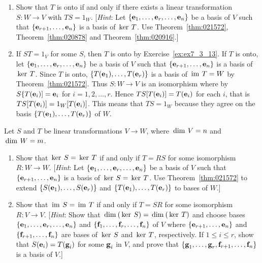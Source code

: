 \begin{multicols}{2}
\begin{ex}
\begin{enumerate}[label={\alph*.}]
\item Show that $T$ is onto if and only if there exists a linear transformation $S : W \to V$ with $TS = 1_{W}$. [\textit{Hint}: Let $\{\textbf{e}_{1}, \dots, \textbf{e}_{r}, \dots, \textbf{e}_{n}\}$ be a basis of $V$ such that $\{\textbf{e}_{r+1}, \dots, \textbf{e}_{n}\}$ is a basis of $\thinspace\operatorname{ker \medspace}T$. Use Theorem~\ref{thm:021572}, Theorem~\ref{thm:020878} and Theorem~\ref{thm:020916}.]

\end{enumerate}
\begin{sol}
\begin{enumerate}[label={\alph*.}]
\setcounter{enumi}{1}
\item If $ST = 1_{V}$ for some $S$, then $T$ is onto by Exercise~\ref{ex:ex7_3_13}. If $T$ is onto, let $\{\textbf{e}_{1}, \dots, \textbf{e}_{r}, \dots, \textbf{e}_{n}\}$ be a basis of $V$ such that $\{\textbf{e}_{r+1}, \dots, \textbf{e}_{n}\}$ is a basis of $\thinspace\operatorname{ker \medspace}T$. Since $T$ is onto, $\{T(\textbf{e}_{1}), \dots, T(\textbf{e}_{r})\}$ is a basis of $\thinspace\operatorname{im \medspace}T = W$ by Theorem~\ref{thm:021572}. Thus $S : W \to V$ is an isomorphism where by $S\{T(\textbf{e}_{i})] = \textbf{e}_{i}$ for $i = 1, 2, \dots, r$. Hence $TS[T(\textbf{e}_{i})] = T(\textbf{e}_{i})$ for each $i$, that is $TS[T(\textbf{e}_{i})] = 1_{W}[T(\textbf{e}_{i})]$. This means that $TS = 1_{W}$ because they agree on the basis $\{T(\textbf{e}_{1}), \dots, T(\textbf{e}_{r})\}$ of $W$.

\end{enumerate}
\end{sol}
\end{ex}

\begin{ex}\label{ex:ex7_3_28}
Let $S$ and $T$ be linear transformations $V \to W$, where $\thinspace\operatorname{dim \medspace}V = n$ and $\thinspace\operatorname{dim \medspace}W = m$.


\begin{enumerate}[label={\alph*.}]
\item Show that $\thinspace\operatorname{ker \medspace}S = \thinspace\operatorname{ker \medspace}T$ if and only if $T = RS$ for some isomorphism $R : W \to W$. [\textit{Hint}: Let $\{\textbf{e}_{1}, \dots, \textbf{e}_{r}, \dots, \textbf{e}_{n}\}$ be a basis of $V$ such that $\{\textbf{e}_{r+1}, \dots, \textbf{e}_{n}\}$ is a basis of $\thinspace\operatorname{ker \medspace}S = \thinspace\operatorname{ker \medspace}T$. Use Theorem~\ref{thm:021572} to extend $\{S(\textbf{e}_{1}), \dots, S(\textbf{e}_{r})\}$ and $\{T(\textbf{e}_{1}), \dots, T(\textbf{e}_{r})\}$ to bases of $W$.]

\item Show that $\thinspace\operatorname{im \medspace}S = \thinspace\operatorname{im \medspace}T$ if and only if $T = SR$ for some isomorphism $R : V \to V$. [\textit{Hint}: Show that $\thinspace\operatorname{dim\medspace}(\thinspace\operatorname{ker \medspace}S) = \thinspace\operatorname{dim\medspace}(\thinspace\operatorname{ker \medspace}T)$ and choose bases $\{\textbf{e}_{1}, \dots, \textbf{e}_{r}, \dots, \textbf{e}_{n}\}$ and $\{\textbf{f}_{1}, \dots, \textbf{f}_{r}, \dots, \textbf{f}_{n}\}$ of $V$ where $\{\textbf{e}_{r+1}, \dots, \textbf{e}_{n}\}$ and $\{\textbf{f}_{r+1}, \dots, \textbf{f}_{n}\}$ are bases of $\thinspace\operatorname{ker \medspace}S$ and $\thinspace\operatorname{ker \medspace}T$, respectively. If $1 \leq i \leq r$, show that $S(\textbf{e}_{i}) = T(\textbf{g}_{i})$ for some $\textbf{g}_{i}$ in $V$, and prove that $\{\textbf{g}_{1}, \dots, \textbf{g}_{r}, \textbf{f}_{r+1}, \dots, \textbf{f}_{n}\}$ is a basis of $V$.]


\end{enumerate}
\end{ex}
\end{multicols}
